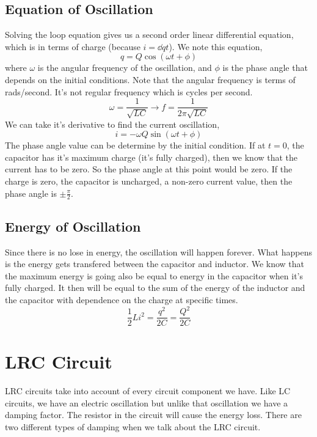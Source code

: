 \subsection{Equation of Oscillation}
Solving the loop equation gives us a second order linear differential equation, which is in terms of charge (because $i = \dd{q}{t}$). We note this equation,
\begin{equation*}
	q = Q\cos(\omega t + \phi )
\end{equation*}	
where $\omega$ is the angular frequency of the oscillation, and $\phi$ is the phase angle that depends on the initial conditions. Note that the angular frequency is terms of rads/second. It's not regular frequency which is cycles per second.
\begin{equation*}
	\omega = \frac{1}{\sqrt{LC}} \to f = \frac{1}{2\pi\sqrt{LC}}
\end{equation*}
We can take it's derivative to find the current oscillation, 
\begin{equation*}
	i = -\omega Q\sin(\omega t + \phi)
\end{equation*}
The phase angle value can be determine by the initial condition. If at $t=0$, the capacitor has it's maximum charge (it's fully charged), then we know that the current has to be zero. So the phase angle at this point would be zero. If the charge is zero, the capacitor is uncharged, a non-zero current value, then the phase angle is $\pm \frac{\pi}{2}$.

\subsection{Energy of Oscillation}
Since there is no lose in energy, the oscillation will happen forever. What happens is the energy gets transfered between the capacitor and inductor. We know that the maximum energy is going also be equal to energy in the capacitor when it's fully charged. It then will be equal to the sum of the energy of the inductor and the capacitor with dependence on the charge at specific times. 
\begin{equation*}
	\frac{1}{2}Li^2 = \frac{q^2}{2C} = \frac{Q^2}{2C}
\end{equation*}

\section{LRC Circuit}
LRC circuits take into account of every circuit component we have. Like LC circuits, we have an electric oscillation but unlike that oscillation we have a damping factor. The resistor in the circuit will cause the energy loss. There are two different types of damping when we talk about the LRC circuit. 

